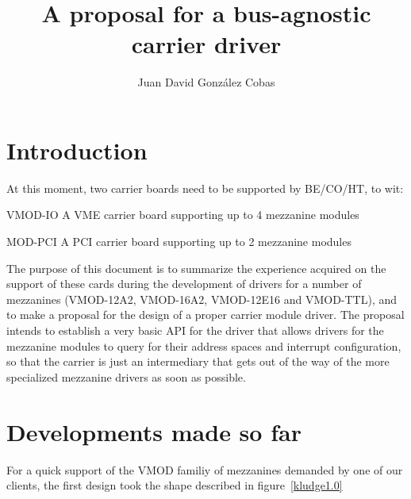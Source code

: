 \documentclass{article}
\title{A proposal for a bus-agnostic carrier driver}
\author{Juan David Gonz\'alez Cobas \email{dcobas@cern.ch}}
\begin{document}
\section{Introduction}

At this moment, two carrier boards need to be supported by BE/CO/HT,
to wit:
\begin{compactdesc}
\item[VMOD-IO] A VME carrier board supporting up to 4 mezzanine modules
\item[MOD-PCI] A PCI carrier board supporting up to 2 mezzanine modules
\end{compactdesc}

The purpose of this document is to summarize the experience acquired
on the support of these cards during the development of drivers for a
number of mezzanines (VMOD-12A2, VMOD-16A2, VMOD-12E16 and VMOD-TTL),
and to make a proposal for the design of a proper carrier module driver.
The proposal intends to establish a very basic API for the driver that
allows drivers for the mezzanine modules to query for their address
spaces and interrupt configuration, so that the carrier is just an
intermediary that gets out of the way of the more specialized mezzanine
drivers as soon as possible.

\section{Developments made so far}

For a quick support of the VMOD familiy of mezzanines demanded by one of
our clients, the first design took the shape described in
figure~\ref{kludge1.0}
\end{document}

